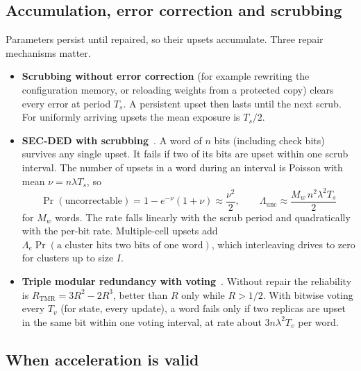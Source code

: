 \documentclass[11pt,a4paper]{article}
\begin{document}
\subsection{Accumulation, error correction and scrubbing}
\label{sec:ecc}

Parameters persist until repaired, so their upsets accumulate. Three repair mechanisms matter.
\begin{itemize}
  \item \textbf{Scrubbing without error correction} (for example rewriting the configuration memory, or reloading weights from a protected copy) clears every error at period $T_s$. A persistent upset then lasts until the next scrub. For uniformly arriving upsets the mean exposure is $T_s/2$.
  \item \textbf{SEC-DED with scrubbing}~\cite{hsiao1970,saleh1990}. A word of $n$ bits (including check bits) survives any single upset. It fails if two of its bits are upset within one scrub interval. The number of upsets in a word during an interval is Poisson with mean $\nu = n\lambda T_s$, so
  \begin{equation}
  \Pr(\text{uncorrectable}) = 1 - e^{-\nu}(1+\nu) \approx \frac{\nu^2}{2},
  \qquad
  \Lambda_{\mathrm{unc}} \approx \frac{M_w\, n^2 \lambda^2 T_s}{2}
  \label{eq:secded}
  \end{equation}
  for $M_w$ words. The rate falls linearly with the scrub period and quadratically with the per-bit rate. Multiple-cell upsets add $\Lambda_e \Pr(\text{a cluster hits two bits of one word})$, which interleaving drives to zero for clusters up to size $I$.
  \item \textbf{Triple modular redundancy with voting}~\cite{lyons1962}. Without repair the reliability is $R_{\mathrm{TMR}} = 3R^2 - 2R^3$, better than $R$ only while $R > 1/2$. With bitwise voting every $T_v$ (for state, every update), a word fails only if two replicas are upset in the same bit within one voting interval, at rate about $3 n \lambda^2 T_v$ per word.
\end{itemize}

\subsection{When acceleration is valid}
\label{sec:accel}
\end{document}
